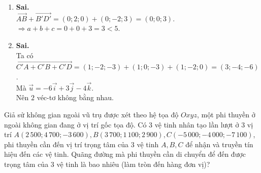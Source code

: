 \begin{ex}
{\begin{enumerate}
			$\heva{&AC'=\sqrt{14} \\
			&\cos\left(\overrightarrow{AA'};\overrightarrow{AC'}\right)=\cos \widehat{A'AC'}=\dfrac{1}{\sqrt{14}}.}$\\
			$\Rightarrow \overrightarrow{AA'}\cdot\overrightarrow{AC'}=\left|\overrightarrow{AA'}\right|\cdot\left|\overrightarrow{AC'}\right|\cdot\cos\left(\overrightarrow{AA'};\overrightarrow{AC'}\right)=1\cdot\sqrt{14}\dfrac{1}{\sqrt{14}}=1$.
			\item \textbf{Sai.}\\
			$\overrightarrow{AB}+\overrightarrow{B'D'}=(0;2;0)+(0;-2;3)=(0;0;3)$.\\
			$\Rightarrow a+b+c=0+0+3=3<5$.
			\item \textbf{Sai.}\\
			Ta có $\overrightarrow{C'A+C'B+C'D}=(1;-2;-3)+(1;0;-3)+(1;-2;0)=(3;-4;-6)$.\\
			Mà $\overrightarrow{u}=-6\overrightarrow{i}+3\overrightarrow{j}-4\overrightarrow{k}$.\\
			Nên $2$ véc-tơ không bằng nhau.
		\end{enumerate}
	}
\end{ex}

\begin{ex}%
	Giả sử không gian ngoài vũ trụ được xét theo hệ tọa độ $Oxyz$, một phi thuyền ở ngoài không gian đang ở vị trí gốc tọa độ. Có $3$ vệ tinh nhân tạo lần lượt ở $3$ vị trí $A(2\,500;4\,700;-3\,600), B(3\,700;1\,100;2\,900), C(-5\,000;-4\,000;-7\,100)$, phi thuyền cần đến vị trí trọng tâm của $3$ vệ tinh $A,B,C$ để nhận và truyền tín hiệu đến các vệ tinh. Quãng đường mà phi thuyền cần di chuyển để đến được trọng tâm của $3$ vệ tinh là bao nhiêu (làm tròn đến hàng đơn vị)?
\end{ex}

